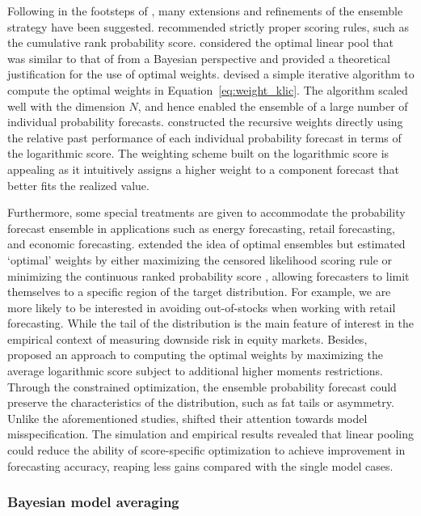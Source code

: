 \documentclass[11pt]{article}
\begin{document}
Following in the footsteps of \cite{Hall2007-lh}, many extensions and refinements of the ensemble strategy have been suggested. \cite{Gneiting2007-ij} recommended strictly proper scoring rules, such as the cumulative rank probability score. \cite{Geweke2011-xk} considered the optimal linear pool that was similar to that of \cite{Hall2007-lh} from a Bayesian perspective and provided a theoretical justification for the use of optimal weights. \cite{Conflitti2015-fq} devised a simple iterative algorithm to compute the optimal weights in Equation~\eqref{eq:weight_klic}. The algorithm scaled well with the dimension $N$, and hence enabled the ensemble of a large number of individual probability forecasts. \cite{Jore2010-yi} constructed the recursive weights directly using the relative past performance of each individual probability forecast in terms of the logarithmic score. The weighting scheme built on the logarithmic score is appealing as it intuitively assigns a higher weight to a component forecast that better fits the realized value.

Furthermore, some special treatments are given to accommodate the probability forecast ensemble in applications such as energy forecasting, retail forecasting, and economic forecasting. \cite{Opschoor2017-yu} extended the idea of optimal ensembles but estimated `optimal' weights by either maximizing the censored likelihood scoring rule \citep{Diks2011-gj} or minimizing the continuous ranked probability score \citep{Gneiting2014-tz}, allowing forecasters to limit themselves to a specific region of the target distribution. For example, we are more likely to be interested in avoiding out-of-stocks when working with retail forecasting. While the tail of the distribution is the main feature of interest in the empirical context of measuring downside risk in equity markets. Besides, \cite{Pauwels2020-zl} proposed an approach to computing the optimal weights by maximizing the average logarithmic score subject to additional higher moments restrictions. Through the constrained optimization, the ensemble probability forecast could preserve the characteristics of the distribution, such as fat tails or asymmetry. Unlike the aforementioned studies, \cite{Martin2020-yi} shifted their attention towards model misspecification. The simulation and empirical results revealed that linear pooling could reduce the ability of score-specific optimization to achieve improvement in forecasting accuracy, reaping less gains compared with the single model cases.

\subsubsection{Bayesian model averaging}
\label{sec:bayesian_model_averaging}
\end{document}
